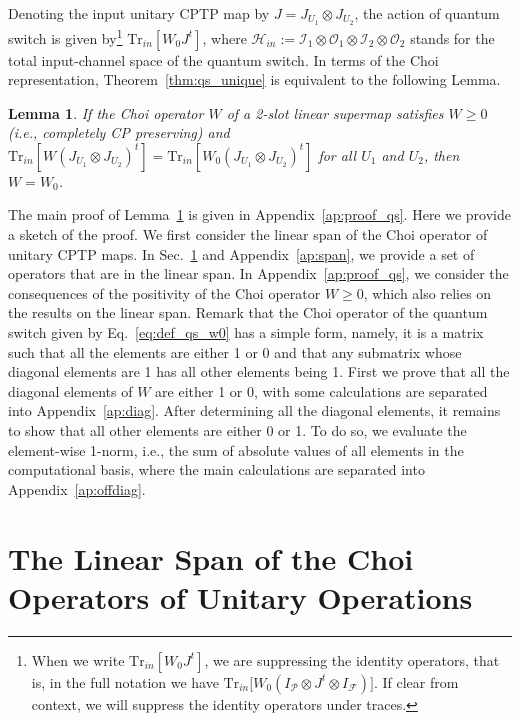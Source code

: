 \documentclass[a4paper,twocolumn,accepted=2022-10-23]{quantumarticle}
\newcommand{\Tr}[0]{{\mathrm{Tr}}}
\newcommand{\fcal}[0]{{\mathcal{F}}}
\newcommand{\ical}[0]{{\mathcal{I}}}
\newcommand{\ocal}[0]{{\mathcal{O}}}
\newcommand{\pcal}[0]{{\mathcal{P}}}
\newtheorem{lem}{Lemma}
\theoremstyle{definition}
\begin{document}
Denoting the input unitary CPTP map by $J = J_{U_1} \otimes J_{U_2}$, the action of quantum switch is given by\footnote{When we write  $\Tr_{in} [W_0 J^t]$, we are suppressing the identity operators, that is, in the full notation we have  $\Tr_{in}\big[ W_0 (I_\pcal\otimes J^t\otimes I_\fcal)\big]$.  If clear from context, we will suppress the identity operators under traces.}
 $\Tr_{in} [W_0 J^t]$, where $\mathcal{H}_{in}:=\ical_1 \otimes  \ocal_1\otimes \ical_2\otimes \ocal_2$ stands for the total input-channel space of the quantum switch.
In terms of the Choi representation, Theorem~\ref{thm:qs_unique} is equivalent to the following Lemma.
\begin{lem}\label{lem:qs_unique}
If the Choi operator $W$ of a 2-slot linear supermap satisfies $W \geq 0$ (i.e., completely CP preserving) and $\Tr_{in} [ W (J_{U_1} \otimes J_{U_2})^t ] = \Tr_{in} [ W_0 (J_{U_1} \otimes J_{U_2})^t] $ for all $U_1$ and $U_2$, then $W = W_0$.
\end{lem}
The main proof of Lemma~\ref{lem:qs_unique} is given in Appendix~\ref{ap:proof_qs}.
Here we provide a sketch of the proof.
We first consider the linear span of the Choi operator of unitary CPTP maps.
In Sec.~\ref{sec:span} and Appendix~\ref{ap:span}, we provide a set of operators that are in the linear span.
In Appendix~\ref{ap:proof_qs}, we consider the consequences of the positivity of the Choi operator $W \geq 0$, which also relies on the results on the linear span.
Remark that the Choi operator of the quantum switch given by Eq.~\eqref{eq:def_qs_w0} has a simple form, namely,
it is a matrix such that all the elements are either 1 or 0 and that any submatrix whose diagonal elements are 1 has all other elements being 1.
First we prove that all the diagonal elements of $W$ are either 1 or 0, with some calculations are separated into Appendix~\ref{ap:diag}.
After determining all the diagonal elements, it remains to show that all other elements are either 0 or 1.
To do so, we evaluate the element-wise 1-norm, i.e., the sum of absolute values of all elements in the computational basis, where the main calculations are separated into Appendix~\ref{ap:offdiag}.

\section{The Linear Span of the Choi Operators of Unitary Operations}\label{sec:span}
\end{document}
